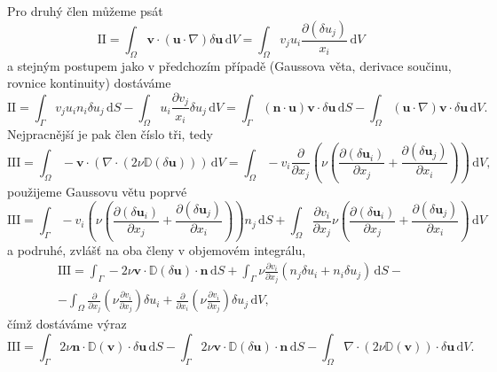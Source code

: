 Pro druhý člen můžeme psát
\begin{equation*}
\mathrm{II}
=
\int_{\Omega} 
\mathbf{v}\cdot(\mathbf{u}\cdot \nabla)\delta\mathbf{u}
\, \mathrm{d}V
=
\int_{\Omega} 
v_j  u_i \frac{\partial (\delta u_j)}{x_i}
\, \mathrm{d}V
\end{equation*}
a stejným postupem jako v předchozím případě (Gaussova věta, derivace součinu, rovnice kontinuity) dostáváme
\begin{equation}\label{eq:clen_II}
\mathrm{II}
=
\int_{\Gamma} 
v_j u_i n_i \delta u_j  
\, \mathrm{d}S
-
\int_{\Omega} 
u_i \frac{\partial v_j  }{x_i} \delta u_j
\, \mathrm{d}V
=
\int_{\Gamma} 
(\mathbf{n} \cdot \mathbf{u}) \mathbf{v}\cdot \delta \mathbf{u} 
\, \mathrm{d}S
-
\int_{\Omega} 
(\mathbf{u} \cdot \nabla)\mathbf{v}\cdot \delta \mathbf{u}
\, \mathrm{d}V.
\end{equation}
Nejpracnější je pak člen číslo tři, tedy
\begin{equation*}
\mathrm{III}
=
\int_{\Omega} 
-\mathbf{v}\cdot \left(\nabla \cdot (2\nu \mathbb{D}(\delta \mathbf{u}) )\right)
\, \mathrm{d}V
=
\int_{\Omega} 
- v_i \frac{\partial}{\partial x_j} \left(  \nu
\left(\frac{\partial (\delta \mathbf{u}_i)}{\partial x_j} + 
\frac{\partial (\delta \mathbf{u}_j)}{\partial x_i}\right)
\right)
\, \mathrm{d}V,
\end{equation*}
použijeme Gaussovu větu poprvé
\begin{equation*}
\mathrm{III}
=
\int_{\Gamma} 
- v_i \left(  \nu
\left(\frac{\partial (\delta \mathbf{u}_i)}{\partial x_j} + 
\frac{\partial (\delta \mathbf{u}_j)}{\partial x_i}\right)
\right) n_j
\, \mathrm{d}S
+
\int_{\Omega} 
\frac{\partial v_i}{\partial x_j}   \nu
\left(\frac{\partial (\delta \mathbf{u}_i)}{\partial x_j} + 
\frac{\partial (\delta \mathbf{u}_j)}{\partial x_i}\right)
\, \mathrm{d}V
\end{equation*}
a podruhé, zvlášť na oba členy v objemovém integrálu,
\begin{multline*}
\mathrm{III}
=
\int_{\Gamma} 
- 2\nu \mathbf{v} \cdot  \mathbb{D}(\delta \mathbf{u})\cdot \mathbf{n}
\, \mathrm{d}S
+
\int_{\Gamma} 
\nu \frac{\partial v_i}{\partial x_j}
(n_j \delta u_i + n_i \delta u_j)
\, \mathrm{d}S
-\\-
\int_{\Omega} 
\frac{\partial}{\partial x_j}\left( \nu \frac{\partial v_i}{\partial x_j} \right) \delta u_i + \frac{\partial}{\partial x_i}\left( \nu \frac{\partial v_i}{\partial x_j} \right) \delta u_j
\, \mathrm{d}V,
\end{multline*}
čímž dostáváme výraz
\begin{equation}\label{eq:clen_III}
\mathrm{III}
=
\int_{\Gamma} 
2\nu \mathbf{n} \cdot  \mathbb{D}(\mathbf{v})\cdot \delta \mathbf{u}
\, \mathrm{d}S
- \int_{\Gamma} 
2\nu \mathbf{v} \cdot  \mathbb{D}(\delta \mathbf{u})\cdot \mathbf{n}
\, \mathrm{d}S
-
\int_{\Omega} 
\nabla \cdot \left( 2\nu \mathbb{D}(\mathbf{v}) \right) \cdot \delta \mathbf{u}
\, \mathrm{d}V.
\end{equation}
